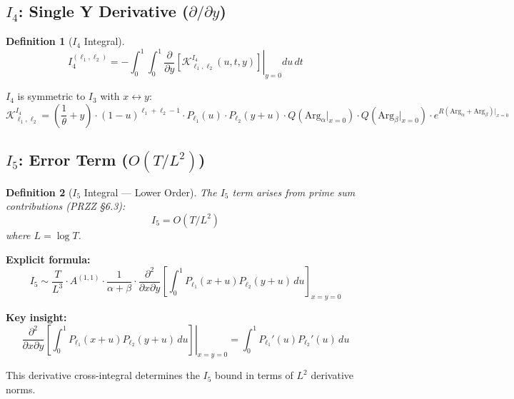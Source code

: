 \documentclass[11pt]{article}
\newtheorem{definition}{Definition}
\begin{document}
\subsection{$I_4$: Single Y Derivative ($\partial/\partial y$)}

\begin{definition}[$I_4$ Integral]
\begin{equation}
\boxed{
I_4^{(\ell_1,\ell_2)} = -\int_0^1 \int_0^1 \left.\frac{\partial}{\partial y}\left[\mathcal{K}^{I_4}_{\ell_1,\ell_2}(u,t,y)\right]\right|_{y=0} du\, dt
}
\end{equation}
\end{definition}

$I_4$ is symmetric to $I_3$ with $x \leftrightarrow y$:
\begin{equation}
\mathcal{K}^{I_4}_{\ell_1,\ell_2} = \left(\frac{1}{\theta} + y\right) \cdot (1-u)^{\ell_1+\ell_2-1} \cdot P_{\ell_1}(u) \cdot P_{\ell_2}(y+u) \cdot Q(\text{Arg}_\alpha|_{x=0}) \cdot Q(\text{Arg}_\beta|_{x=0}) \cdot e^{R(\text{Arg}_\alpha+\text{Arg}_\beta)|_{x=0}}
\end{equation}

\subsection{$I_5$: Error Term ($O(T/L^2)$)}

\begin{definition}[$I_5$ Integral --- Lower Order]
The $I_5$ term arises from prime sum contributions (PRZZ \S6.3):
\begin{equation}
I_5 = O(T/L^2)
\end{equation}
where $L = \log T$.
\end{definition}

\textbf{Explicit formula:}
\begin{equation}
I_5 \sim \frac{T}{L^3} \cdot A^{(1,1)} \cdot \frac{1}{\alpha+\beta} \cdot \frac{\partial^2}{\partial x \partial y}\left[\int_0^1 P_{\ell_1}(x+u) P_{\ell_2}(y+u) \, du\right]_{x=y=0}
\end{equation}

\textbf{Key insight:}
\begin{equation}
\left.\frac{\partial^2}{\partial x \partial y}\left[\int_0^1 P_{\ell_1}(x+u) P_{\ell_2}(y+u) \, du\right]\right|_{x=y=0} = \int_0^1 P_{\ell_1}'(u) P_{\ell_2}'(u) \, du
\end{equation}

This derivative cross-integral determines the $I_5$ bound in terms of $L^2$ derivative norms.
\end{document}
